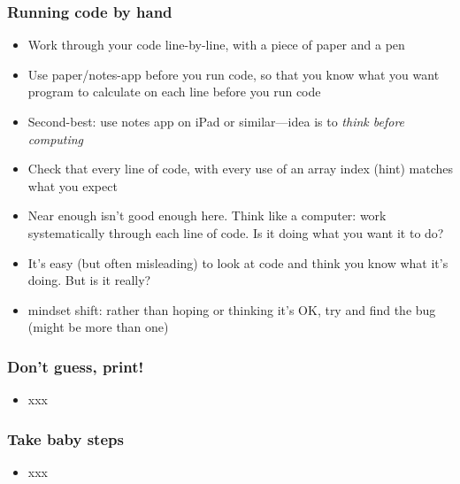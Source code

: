 \documentclass[14pt]{beamer}
\begin{document}
\begin{frame}[fragile]

\frametitle{Running code by hand}

\begin{itemize}
	\item Work through your code line-by-line, with a piece of paper and a pen
	\item Use paper/notes-app before you run code, so that you know what you want program to calculate on each line before you run code
	\item Second-best: use notes app on iPad or similar---idea is to \emph{think before computing}
	\item Check that every line of code, with every use of an array index (hint) matches what you expect
	\item Near enough isn't good enough here. Think like a computer: work systematically through each line of code. Is it doing what you want it to do?
	\item It's easy (but often misleading) to look at code and think you know what it's doing. But is it really?
	\item mindset shift: rather than hoping or thinking it's OK, try and find the bug (might be more than one)
\end{itemize}

\end{frame}


\begin{frame}[fragile]

\frametitle{Don't guess, print!}

\begin{itemize}
	\item xxx
\end{itemize}

\end{frame}


\begin{frame}[fragile]

\frametitle{Take baby steps}

\begin{itemize}
	\item xxx
\end{itemize}

\end{frame}
\end{document}
